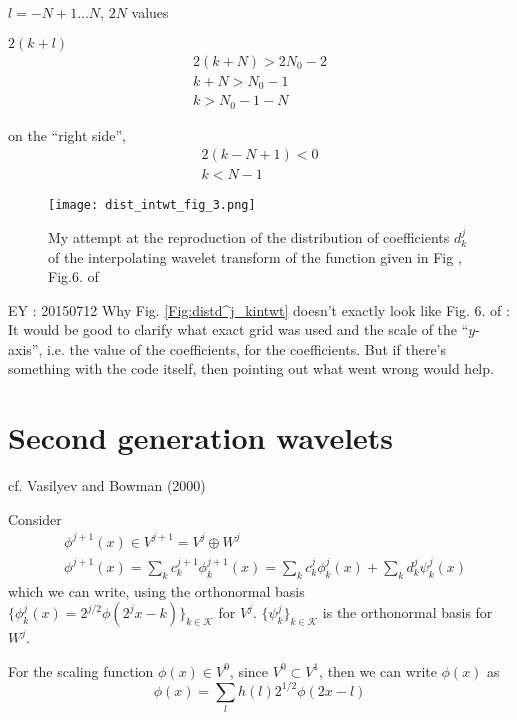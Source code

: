 \documentclass[twoside]{amsart}
\theoremstyle{plain}
\theoremstyle{definition}
\theoremstyle{remark}
\numberwithin{equation}{section}
\begin{document}
$l=-N+1 \dots N$, $2N$ values 

$2(k+l)$  \\

\[
\begin{gathered}
  2(k+N) > 2N_0 -2 \\
  k+N > N_0 -1 \\
  k > N_0 -1 - N 
\end{gathered}
\]

on the ``right side'',
\[
\begin{gathered}
  2(k-N+1) < 0 \\
  k < N-1
\end{gathered}
\] 

\begin{figure}[h!] \label{Fig:distd^j_kintwt}
 \caption{My attempt at the reproduction of the distribution of coefficients $d^j_k$ of the interpolating wavelet transform of the function given in Fig \label{Fig:fwdinvintwt_fig_2}, Fig.6. of \cite{OVasilyevCBowman2000}}
 \centering
   \texttt{[image: dist\_intwt\_fig\_3.png]}
\end{figure}

EY : 20150712 Why Fig. \ref{Fig:distd^j_kintwt} doesn't exactly look like Fig. 6. of \cite{OVasilyevCBowman2000}: It would be good to clarify what exact grid was used and the scale of the ``$y$-axis'', i.e. the value of the coefficients, for the coefficients.  But if there's something with the code itself, then pointing out what went wrong would help.  

\section{Second generation wavelets}\label{Sec:2ndGenWavelets} cf. Vasilyev and Bowman (2000)\cite{OVasilyevCBowman2000}

Consider 
\[
\begin{aligned}
& \phi^{j+1}(x) \in V^{j+1} = V^j \oplus W^j \\
& \phi^{j+1}(x) = \sum_k c_k^{j+1} \phi_k^{j+1}(x) = \sum_k c_k^j \phi_k^j(x) + \sum_k d_k^j \psi_k^j(x) \end{aligned}
\]
which we can write, using the orthonormal basis $\lbrace \phi_k^j(x) = 2^{j/2}\phi(2^jx-k) \rbrace_{k\in \mathcal{K}}$ for $V^j$.  $\lbrace \psi^j_k \rbrace_{k\in \mathcal{K}}$ is the orthonormal basis for $W^j$. 

For the scaling function $\phi(x) \in V^0$, since $V^0 \subset V^1$, then we can write $\phi(x)$ as 
\begin{equation}\label{Eq:scalingfunctioninV^1}
\phi(x) = \sum_l h(l) 2^{1/2} \phi(2x-l)
\end{equation}
\end{document}
